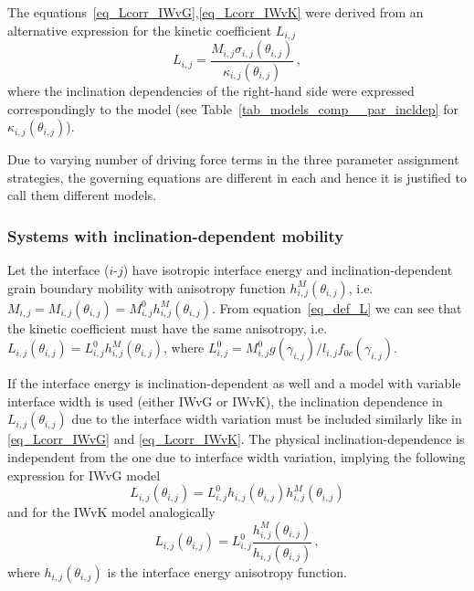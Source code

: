 		The equations~\eqref{eq_Lcorr_IWvG},\eqref{eq_Lcorr_IWvK} were derived from an alternative expression for the kinetic coefficient $L_{i,j}$
		\begin{equation}
			L_{i,j} = \frac{M_{i,j}\sigma_{i,j}(\theta_{i,j})}{\kappa_{i,j}(\theta_{i,j})} \,,
		\end{equation}
		where the inclination dependencies of the right-hand side were expressed correspondingly to the model (see Table~\ref{tab_models_comp__par_incldep} for $\kappa_{i,j}(\theta_{i,j})$).
		
		Due to varying number of driving force terms in the three parameter assignment strategies, the governing equations are different in each and hence it is justified to call them different models.

		\subsubsection{Systems with inclination-dependent mobility}
		Let the interface ($i$-$j$) have isotropic interface energy and inclination-dependent grain boundary mobility with anisotropy function $h_{i,j}^M(\theta_{i,j})$, i.e. $M_{i,j}=M_{i,j}(\theta_{i,j})=M_{i,j}^0h_{i,j}^M(\theta_{i,j})$. From equation~\eqref{eq_def_L} we can see that the kinetic coefficient must have the same anisotropy, i.e. $L_{i,j}(\theta_{i,j})=L_{i,j}^0h_{i,j}^M(\theta_{i,j})$, where $L_{i,j}^0=M_{i,j}^0g(\gamma_{i,j})/l_{i,j}f_{0c}(\gamma_{i,j})$. 
		
		If the interface energy is inclination-dependent as well and a model with variable interface width is used (either IWvG or IWvK), the inclination dependence in $L_{i,j}(\theta_{i,j})$ due to the interface width variation must be included similarly like in \eqref{eq_Lcorr_IWvG} and \eqref{eq_Lcorr_IWvK}. The physical inclination-dependence is independent from the one due to interface width variation, implying the following expression for IWvG model
		\begin{equation}     
			L_{i,j}(\theta_{i,j}) = L_{i,j}^0h_{i,j}(\theta_{i,j})h_{i,j}^M(\theta_{i,j})
		\end{equation}
		and for the IWvK model analogically
		\begin{equation}
			L_{i,j}(\theta_{i,j}) = L_{i,j}^0\frac{h_{i,j}^M(\theta_{i,j})}{h_{i,j}(\theta_{i,j})} \,,
		\end{equation}
		where $h_{i,j}(\theta_{i,j})$ is the interface energy anisotropy function.


